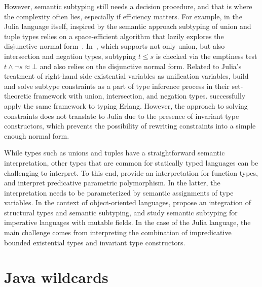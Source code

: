 However, semantic subtyping still needs a decision procedure,
and that is where the complexity often lies, especially if efficiency matters.
For example, in the Julia language itself, inspired by the semantic approach
subtyping of union and tuple types
relies on a space-efficient algorithm that lazily explores the disjunctive
normal form~\cite{chung:julia-sub-algo:2019}.
In~\cite{frisch:sem-sub:2002}, which supports not only union, but also
intersection and negation types, subtyping $t \leq s$ is checked via
the emptiness test $t \land \lnot s \approx \bot$ and also relies on
the disjunctive normal form.
Related to Julia's treatment of right-hand side existential variables as 
unification variables, \citet{castagna:sem-poly-inf:2015} build and solve
subtype constraints as a part of type inference process in their set-theoretic
framework with union, intersection, and negation types.
\citet{schimpf:set-types-erlang:2023} successfully apply the
same framework to typing Erlang.
However, the approach to solving constraints does not translate to Julia
due to the presence of invariant type constructors, which prevents the
possibility of rewriting constraints into a simple enough normal form.

While types such as unions and tuples have a straightforward
semantic interpretation, other types that are common for statically typed
languages can be challenging to interpret.
To this end, \citet{frisch:sem-sub:2002} provide an interpretation for
function types, and \citet{castagna:sem-poly:2011} interpret predicative
parametric polymorphism. In the latter, the interpretation needs to be
parameterized by semantic assignments of type variables.
In the context of object-oriented languages,
\citet{dardha:sem-sub-obj:2016} propose an integration of structural types and
semantic subtyping, and \citet{ancona:sem-sub-imp:2016} study semantic
subtyping for imperative languages with mutable fields.
In the case of the Julia language, %
the main challenge comes from interpreting the combination of
impredicative bounded existential types and invariant type constructors.





\section{Java wildcards}

\TODO{}
